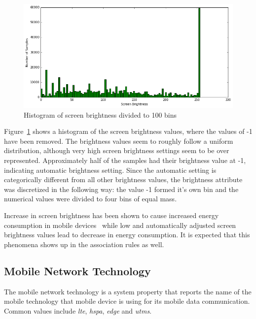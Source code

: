\begin{figure} %
	\centering
	\includegraphics[width=\textwidth]{images/carat-data/screen_brightness.png}
	\caption{Histogram of screen brightness divided to 100 bins}
	\label{figure:carat-data-screen-brightness}
\end{figure}    

Figure~\ref{figure:carat-data-screen-brightness} shows a histogram of the screen brightness values, where the values of -1 have been removed. The brightness values seem to roughly follow a uniform distribution, although very high screen brightness settings seem to be over represented. Approximately half of the samples had their brightness value at -1, indicating automatic brightness setting. Since the automatic setting is categorically different from all other brightness values, the brightness attribute was discretized in the following way: the value -1 formed it's own bin and the numerical values were divided to four bins of equal mass.   

Increase in screen brightness has been shown to cause increased energy consumption in mobile devices~\cite{5375354, PELTONEN201671} while low and automatically adjusted screen brightness values lead to decrease in energy consumption. It is expected that this phenomena shows up in the association rules as well.

\subsection{Mobile Network Technology}  

The mobile network technology is a system property that reports the name of the mobile technology that mobile device is using for its mobile data communication. Common values include \textit{lte}, \textit{hspa}, \textit{edge} and \textit{utms}.

